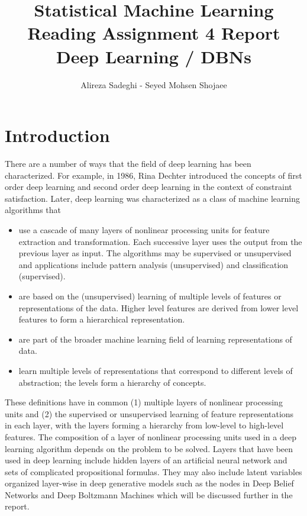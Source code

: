 \documentclass{article}
\title{Statistical Machine Learning \\ Reading Assignment 4 Report \\ Deep Learning / DBNs}
\author{Alireza Sadeghi - Seyed Mohsen Shojaee}
\begin{document}
\maketitle

\section{Introduction}

There are a number of ways that the field of deep learning has been characterized. For example, in 1986, Rina Dechter introduced the concepts of first order deep learning and second order deep learning in the context of constraint satisfaction. Later, deep learning was characterized as a class of machine learning algorithms that 
\begin{itemize}

    \item use a cascade of many layers of nonlinear processing units for feature extraction and transformation. Each successive layer uses the output from the previous layer as input. The algorithms may be supervised or unsupervised and applications include pattern analysis (unsupervised) and classification (supervised).
    \item are based on the (unsupervised) learning of multiple levels of features or representations of the data. Higher level features are derived from lower level features to form a hierarchical representation.
    \item are part of the broader machine learning field of learning representations of data.
    \item learn multiple levels of representations that correspond to different levels of abstraction; the levels form a hierarchy of concepts.

\end{itemize}

These definitions have in common (1) multiple layers of nonlinear processing units and (2) the supervised or unsupervised learning of feature representations in each layer, with the layers forming a hierarchy from low-level to high-level features. The composition of a layer of nonlinear processing units used in a deep learning algorithm depends on the problem to be solved. Layers that have been used in deep learning include hidden layers of an artificial neural network and sets of complicated propositional formulas. They may also include latent variables organized layer-wise in deep generative models such as the nodes in Deep Belief Networks and Deep Boltzmann Machines which will be discussed further in the report.
\end{document}
